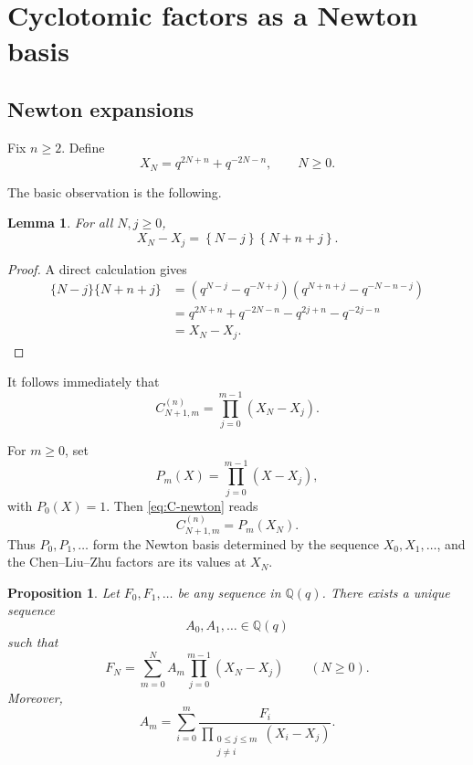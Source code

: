 \documentclass[11pt]{amsart}
\newtheorem{proposition}[theorem]{Proposition}
\newtheorem{lemma}[theorem]{Lemma}
\newcommand{\Q}{\mathbb Q}
\newcommand{\curly}[1]{\left\{#1\right\}}
\begin{document}
\section{Cyclotomic factors as a Newton basis}
\label{sec:QDD}

\subsection{Newton expansions}

Fix \(n\geq2\).  Define
\begin{equation}\label{eq:XN}
X_N
=
q^{2N+n}+q^{-2N-n},
\qquad N\geq0.
\end{equation}

The basic observation is the following.

\begin{lemma}\label{lem:newton-difference}
For all \(N,j\geq0\),
\begin{equation}\label{eq:X-difference}
X_N-X_j
=
\curly{N-j}\curly{N+n+j}.
\end{equation}
\end{lemma}

\begin{proof}
A direct calculation gives
\begin{align*}
\{N-j\}\{N+n+j\}
&=(q^{N-j}-q^{-N+j})(q^{N+n+j}-q^{-N-n-j})\\
&=q^{2N+n}+q^{-2N-n}
  -q^{2j+n}-q^{-2j-n}\\
&=X_N-X_j.
\end{align*}
\end{proof}

It follows immediately that
\begin{equation}\label{eq:C-newton}
C_{N+1,m}^{(n)}
=
\prod_{j=0}^{m-1}(X_N-X_j).
\end{equation}

For \(m\geq0\), set
\[
P_m(X)=\prod_{j=0}^{m-1}(X-X_j),
\]
with \(P_0(X)=1\).  Then \eqref{eq:C-newton} reads
\[
C_{N+1,m}^{(n)}=P_m(X_N).
\]
Thus \(P_0,P_1,\ldots\) form the Newton basis determined by the
sequence \(X_0,X_1,\ldots\), and the Chen--Liu--Zhu factors are its
values at \(X_N\).

\begin{proposition}\label{prop:newton-general}
Let \(F_0,F_1,\ldots\) be any sequence in \(\Q(q)\).
There exists a unique sequence
\[
A_0,A_1,\ldots\in\Q(q)
\]
such that
\begin{equation}\label{eq:newton-expansion-general}
F_N
=
\sum_{m=0}^{N}
A_m
\prod_{j=0}^{m-1}(X_N-X_j)
\qquad
(N\geq0).
\end{equation}
Moreover,
\begin{equation}\label{eq:newton-divided-difference}
A_m
=
\sum_{i=0}^{m}
\frac{F_i}
{\displaystyle
\prod_{\substack{0\leq j\leq m\\j\neq i}}
(X_i-X_j)}.
\end{equation}
\end{proposition}
\end{document}
